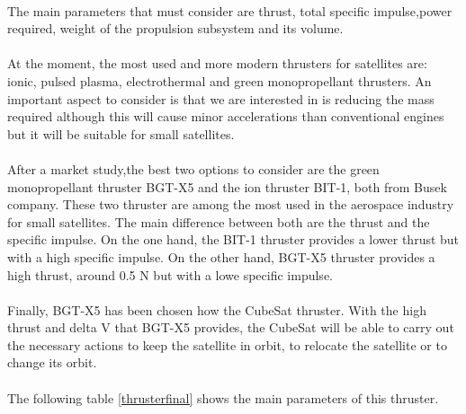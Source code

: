 \paragraph{}
The main parameters that must consider are thrust, total specific impulse,power required, weight of the  propulsion subsystem and its volume.

\paragraph{}
At the moment, the most used and more modern thrusters for satellites are: ionic, pulsed plasma, electrothermal and green monopropellant thrusters. An important aspect to consider is that we are interested in is reducing the mass required although this will cause minor accelerations than conventional engines but it will be suitable for small satellites.

\paragraph{}
After a market study,the best two options to consider are the green monopropellant thruster BGT-X5 and the ion thruster BIT-1, both from Busek company. These two thruster are among the most used in the aerospace industry for small satellites. The main difference between both are the thrust and the specific impulse. On the one hand, the BIT-1 thruster provides a lower thrust but with a high specific impulse. On the other hand, BGT-X5 thruster provides a high thrust, around 0.5 N but with a lowe specific impulse.

\paragraph{}
Finally, BGT-X5 has been chosen how the CubeSat thruster. With the high thrust and delta V that BGT-X5 provides, the CubeSat will be able to carry out the necessary actions to keep the satellite in orbit, to relocate the satellite or to change its orbit.


\paragraph{}
The following table \ref{thrusterfinal} shows the main parameters of this thruster.


